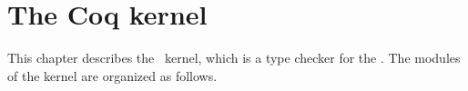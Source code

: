 
\newpage
\section*{The Coq kernel}

\ocwsection \label{kernel}
This chapter describes the \Coq\ kernel, which is a type checker for the \CCI.
The modules of the kernel are organized as follows.

\bigskip
\begin{center}\end{center}

